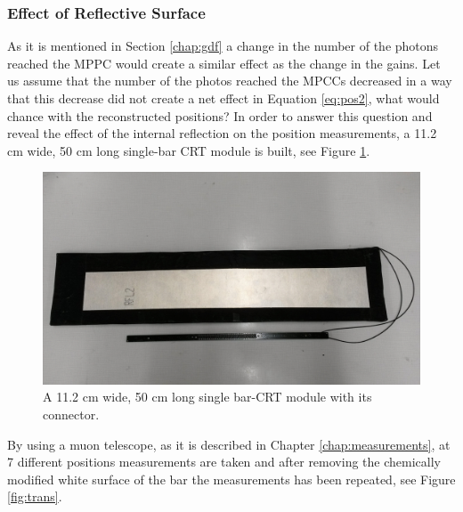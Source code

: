 \documentclass[a4paper]{article}\linespread{1.4}
\begin{document}
\subsubsection{Effect of Reflective Surface}
\label{chap:ref}
As it is mentioned in Section \ref{chap:gdf} a change in the number of the photons reached the MPPC would create a similar effect as the change in the gains. Let us assume that the number of the photos reached the MPCCs decreased in a way that this decrease did not create a net effect in Equation \ref{eq:pos2}, what would chance with the reconstructed positions?
In order to answer this question and reveal the effect of the internal reflection on the position measurements, a 11.2 cm wide, 50 cm long single-bar CRT module is built, see Figure \ref{fig:small}.
\begin{figure}[] \centering \includegraphics[width=120mm,scale=1.0]{figures/small.jpg} \caption{A 11.2 cm wide, 50 cm long single bar-CRT module with its connector.} \label{fig:small} \end{figure}  
By using a muon telescope, as it is described in Chapter \ref{chap:measurements}, at 7 different positions measurements are taken and after removing the chemically modified white surface of the bar the measurements has been repeated, see Figure \ref{fig:trans}.
\end{document}
